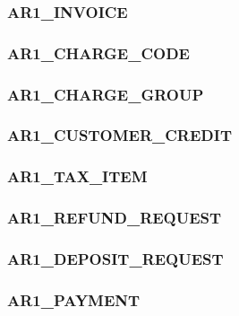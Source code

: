 \documentclass[12pt,twoside]{article}
\begin{document}
\subsubsection{AR1\_INVOICE}
\label{sec:orgheadline87}
\subsubsection{AR1\_CHARGE\_CODE}
\label{sec:orgheadline88}

\subsubsection{AR1\_CHARGE\_GROUP}
\label{sec:orgheadline89}

\subsubsection{AR1\_CUSTOMER\_CREDIT}
\label{sec:orgheadline90}
\subsubsection{AR1\_TAX\_ITEM}
\label{sec:orgheadline91}

\subsubsection{AR1\_REFUND\_REQUEST}
\label{sec:orgheadline92}
\subsubsection{AR1\_DEPOSIT\_REQUEST}
\label{sec:orgheadline93}
\subsubsection{AR1\_PAYMENT}
\label{sec:orgheadline94}
\footnotesize
\end{document}
